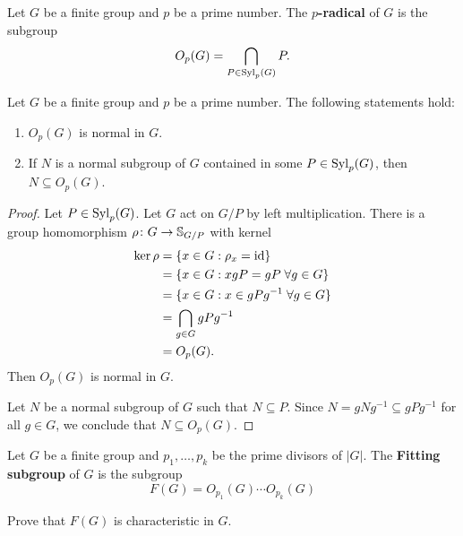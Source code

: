 \begin{definition}
Let $G$ be a finite group and $p$ be a prime number. 
The \textbf{$p$-radical} of $G$ is the subgroup 
\[
O_p(G)=\bigcap_{P\in\mathrm{Syl}_p(G)}P.
\]
\end{definition}

\begin{lemma}
\label{lem:core:Op(G)}
Let $G$ be a finite group and $p$ be a prime number. The following statements hold: 
\begin{enumerate}
    \item $O_p(G)$ is normal in $G$.
    \item If $N$ is a normal subgroup of $G$ contained in some 
    $P\in\mathrm{Syl}_p(G)$, then $N\subseteq O_p(G)$.
\end{enumerate}
\end{lemma}

\begin{proof}
Let $P\in\mathrm{Syl}_p(G)$. Let $G$ act on $G/P$ by left multiplication. There is a group homomorphism 
$\rho\colon G\to\mathbb{S}_{G/P}$ with kernel 
\begin{align*}
		\ker\rho&=\{x\in G:\rho_x=\operatorname{id}\}\\
		&=\{x\in G:xgP=gP\;\forall g\in G\}\\
		&=\{x\in G:x\in gPg^{-1}\;\forall g\in G\}\\
    &=\bigcap_{g\in G}gPg^{-1}\\
    &=O_p(G).
\end{align*}
Then $O_p(G)$ is normal in $G$.

Let $N$ be a normal subgroup of $G$ such that $N\subseteq P$. Since 
$N=gNg^{-1}\subseteq gPg^{-1}$ for all $g\in G$, we conclude that 
$N\subseteq O_p(G)$.
\end{proof}

\begin{definition}
Let $G$ be a finite group and $p_1,\dots,p_k$ be the prime divisors of 
$|G|$. The \textbf{Fitting subgroup} of $G$ is the subgroup 
\[
F(G)=O_{p_1}(G)\cdots O_{p_k}(G)
\]
\end{definition}

\begin{exercise}
\label{xca:Fitting_char}
Prove that $F(G)$ is characteristic in $G$.
\end{exercise}


